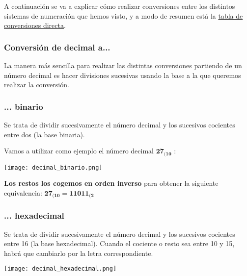 
A continuación se va a explicar cómo realizar conversiones entre los distintos sistemas de numeración que hemos visto, y a modo de resumen está la \hyperlink{tabla_conversiones_directas}{tabla de conversiones directa}.

\subsubsection{Conversión de decimal a...}
La manera más sencilla para realizar las distintas conversiones partiendo de un número decimal es hacer divisiones sucesivas usando la base a la que queremos realizar la conversión.

\subsubsection*{... binario}
Se trata de dividir sucesivamente el número decimal y los sucesivos cocientes entre dos (la base binaria).

Vamos a utilizar como ejemplo el número decimal $\mathbf{27_{(10}}$ :

\begin{center}
    \vspace{-20pt}
    \texttt{[image: decimal\_binario.png]}
    \vspace{-20pt}
\end{center}

\textbf{Los restos los cogemos en orden inverso} para obtener la siguiente equivalencia: $\mathbf{27_{(10} = 11011_{(2}}$

\subsubsection*{... hexadecimal}
Se trata de dividir sucesivamente el número decimal y los sucesivos cocientes entre 16 (la base hexadecimal). Cuando el cociente o resto sea entre 10 y 15, habrá que cambiarlo por la letra correspondiente.

\begin{center}
    \vspace{-10pt}
    \texttt{[image: decimal\_hexadecimal.png]}
    \vspace{-15pt}
\end{center}

